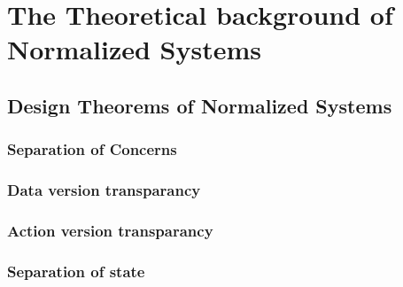 \section{The Theoretical background of Normalized Systems} \label{ns_theory}

\subsection{Design Theorems of Normalized Systems} \label{subsec:ns_desing_theorems}
\lipsum[1-1]

\subsubsection{Separation of Concerns}
\lipsum[1-1]

\subsubsection{Data version transparancy}
\lipsum[1-1]

\subsubsection{Action version transparancy}
\lipsum[1-1]

\subsubsection{Separation of state}
\lipsum[1-1]